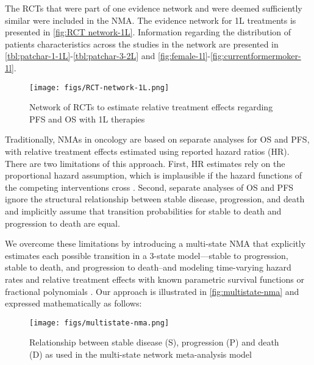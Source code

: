 \documentclass[11pt,final,fleqn]{article}\usepackage[]{graphicx}\usepackage[]{color}
\theoremstyle{plain}
\newcounter{subsubsubsection}[subsubsection]
\begin{document}
{The RCTs that were part of one evidence network and were deemed sufficiently similar were included in the NMA. The evidence network for 1L treatments is presented in \autoref{fig:RCT network-1L}. Information regarding the distribution of patients characteristics across the studies in the network  are presented in  \autoref{tbl:patchar-1-1L}-\autoref{tbl:patchar-3-2L} and \autoref{fig:female-1l}-\autoref{fig:currentformermoker-1l}.

\begin{figure}
\centering
\texttt{[image: figs/RCT-network-1L.png]}
\caption{Network of RCTs to estimate relative treatment effects regarding PFS and OS with 1L therapies}\label{fig:RCT network-1L}
\end{figure}

\FloatBarrier

Traditionally, NMAs in oncology are based on separate analyses for OS and PFS, with relative treatment effects estimated using reported hazard ratios (HR). There are two limitations of this approach. First, HR estimates rely on the proportional hazard assumption, which is implausible if the hazard functions of the competing interventions cross \citep[Chapter~10]{dias2018network}. Second, separate analyses of OS and PFS ignore the structural relationship between stable disease, progression, and death and implicitly assume that transition probabilities for stable to death and progression to death are equal.

We overcome these limitations by introducing a multi-state NMA that explicitly estimates each possible transition in a 3-state model---stable to progression, stable to death, and progression to death--and modeling time-varying hazard rates and relative treatment effects with known parametric survival functions or fractional polynomials \citep{jansen2013multivariate}. Our approach is illustrated in \autoref{fig:multistate-nma} and expressed mathematically as follows:

\FloatBarrier


\begin{figure}
\centering
\texttt{[image: figs/multistate-nma.png]}
\caption{Relationship between stable disease (S), progression (P) and death (D) as used in the multi-state network meta-analysis model}\label{fig:multistate-nma}
\end{figure}



}
\end{document}
